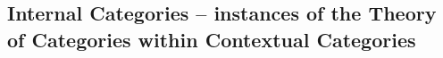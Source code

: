 \documentclass[10pt,a4paper]{article}
\theoremstyle{remark}
\begin{document}
\subsection{Internal Categories -- instances of the Theory of Categories within Contextual Categories}
\label{categoriesinstanceexample}

\fi

%

% 


\end{document}
